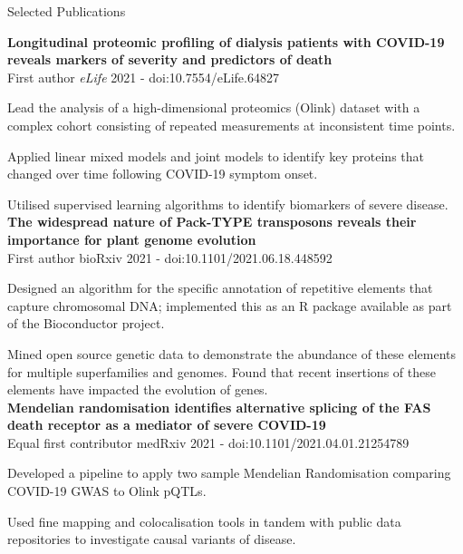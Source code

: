 \documentclass{resume}
\begin{document}
\begin{rSection}{Selected Publications}

\textbf{Longitudinal proteomic profiling of dialysis patients with COVID-19 reveals markers of severity and predictors of death} \\
First author \hfill  \textit{eLife} 2021 - doi:10.7554/eLife.64827

\vspace{2pt plus 1pt minus 1pt}
\item Lead the analysis of a high-dimensional proteomics (Olink) dataset with a complex cohort consisting of repeated measurements at inconsistent time points.
\item Applied linear mixed models and joint models to identify key proteins that changed over time following COVID-19 symptom onset.
\item Utilised supervised learning algorithms to identify biomarkers of severe disease.\\

\textbf{The widespread nature of Pack-TYPE transposons reveals their importance for plant genome evolution} \\
First author \hfill  bioRxiv 2021 - doi:10.1101/2021.06.18.448592 

\vspace{2pt plus 1pt minus 1pt}
\item Designed an algorithm for the specific annotation of repetitive elements that capture chromosomal DNA; implemented this as an R package available as part of the Bioconductor project.
\item Mined open source genetic data to demonstrate the abundance of these elements for multiple superfamilies and genomes. Found that recent insertions of these elements have impacted the evolution of genes. \\
 
\textbf{Mendelian randomisation identifies alternative splicing of the FAS death receptor as a mediator of severe COVID-19} \\
Equal first contributor \hfill  medRxiv 2021 - doi:10.1101/2021.04.01.21254789

\vspace{2pt plus 1pt minus 1pt}
\item Developed a pipeline to apply two sample Mendelian Randomisation comparing COVID-19 GWAS to Olink pQTLs. 
\item Used fine mapping and colocalisation tools in tandem with public data repositories to investigate causal variants of disease. \\


\end{rSection}
\end{document}
